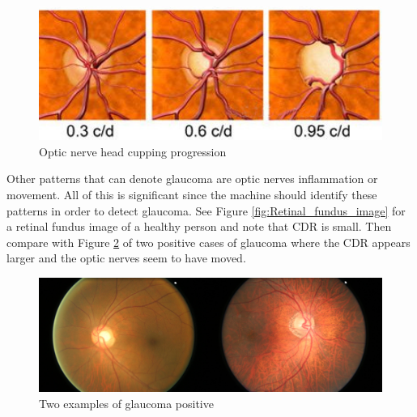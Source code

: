\documentclass[11pt, a4paper]{article}
\begin{document}
\begin{figure}[H]
	\centering
	\includegraphics[width=12cm]{imgs/general/Optic_nerve_head_cupping_progression.jpg}
	\caption{Optic nerve head cupping progression}
	 \label{fig:Optic_nerve_head_cupping_progression}
\end{figure}
\noindent Other patterns that can denote glaucoma are optic nerves inflammation or movement. All of this is significant since the machine should identify these patterns in order to detect glaucoma. See Figure \ref{fig:Retinal_fundus_image} for a retinal fundus image of a healthy person and note that CDR is small. Then compare with Figure \ref{fig:2_examples_of_glaucoma_positive} of two positive cases of glaucoma where the CDR appears larger and the optic nerves seem to have moved.
\begin{figure}[H]
	\centering
	\includegraphics[width=15cm]{imgs/general/2_examples_of_glaucoma_positive.png}
	\caption{Two examples of glaucoma positive}
	 \label{fig:2_examples_of_glaucoma_positive}
\end{figure}
\end{document}
